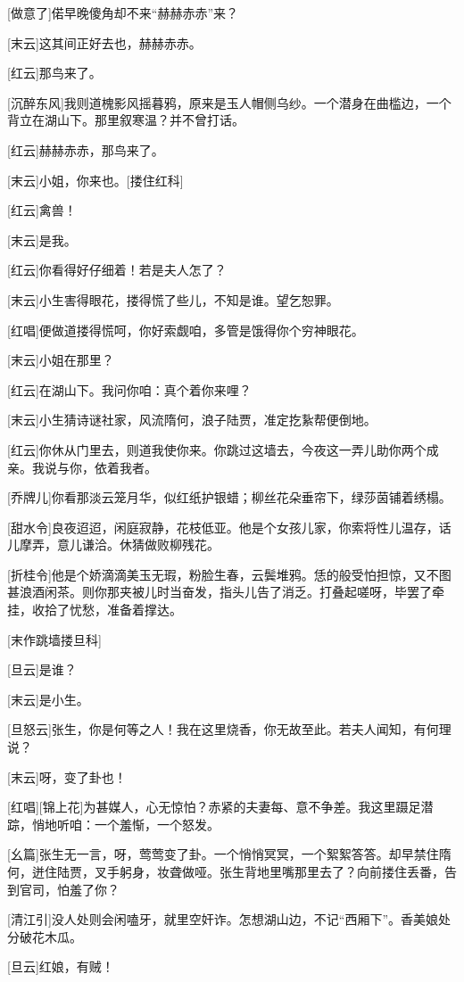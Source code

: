 \documentclass{book}
\begin{document}
[做意了]偌早晚傻角却不来``赫赫赤赤''来？

[末云]这其间正好去也，赫赫赤赤。

[红云]那鸟来了。

[沉醉东风]我则道槐影风摇暮鸦，原来是玉人帽侧乌纱。一个潜身在曲槛边，一个背立在湖山下。那里叙寒温？并不曾打话。

[红云]赫赫赤赤，那鸟来了。

[末云]小姐，你来也。[搂住红科]

[红云]禽兽！

[末云]是我。

[红云]你看得好仔细着！若是夫人怎了？

[末云]小生害得眼花，搂得慌了些儿，不知是谁。望乞恕罪。

[红唱]便做道搂得慌呵，你好索觑咱，多管是饿得你个穷神眼花。

[末云]小姐在那里？

[红云]在湖山下。我问你咱：真个着你来哩？

[末云]小生猜诗谜社家，风流隋何，浪子陆贾，准定扢紥帮便倒地。

[红云]你休从门里去，则道我使你来。你跳过这墙去，今夜这一弄儿助你两个成亲。我说与你，依着我者。

[乔牌儿]你看那淡云笼月华，似红纸护银蜡；柳丝花朵垂帘下，绿莎茵铺着绣榻。

[甜水令]良夜迢迢，闲庭寂静，花枝低亚。他是个女孩儿家，你索将性儿温存，话儿摩弄，意儿谦洽。休猜做败柳残花。

[折桂令]他是个娇滴滴美玉无瑕，粉脸生春，云鬓堆鸦。恁的般受怕担惊，又不图甚浪酒闲茶。则你那夹被儿时当奋发，指头儿告了消乏。打叠起嗟呀，毕罢了牵挂，收拾了忧愁，准备着撑达。

[末作跳墙搂旦科]

[旦云]是谁？

[末云]是小生。

[旦怒云]张生，你是何等之人！我在这里烧香，你无故至此。若夫人闻知，有何理说？

[末云]呀，变了卦也！

[红唱][锦上花]为甚媒人，心无惊怕？赤紧的夫妻每、意不争差。我这里蹑足潜踪，悄地听咱：一个羞惭，一个怒发。

[幺篇]张生无一言，呀，莺莺变了卦。一个悄悄冥冥，一个絮絮答答。却早禁住隋何，迸住陆贾，叉手躬身，妆聋做哑。张生背地里嘴那里去了？向前搂住丢番，告到官司，怕羞了你？

[清江引]没人处则会闲嗑牙，就里空奸诈。怎想湖山边，不记``西厢下''。香美娘处分破花木瓜。

[旦云]红娘，有贼！
\end{document}
